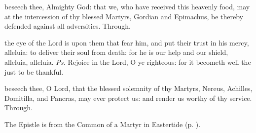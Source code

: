 \vspace{-0.3\baselineskip}

\postcommunion

\vspace{-0.1\baselineskip}

 beseech thee, Almighty God: that we, who have received this heavenly food, may at the intercession of thy blessed Martyrs, Gordian and Epimachus, be thereby defended against all adversities. Through.



\introit
{} the eye of the Lord is upon them that fear him, and put their trust in his mercy, alleluia: to deliver their soul from death: for he is our help and our shield, alleluia, alleluia. \textit{Ps.} Rejoice in the Lord, O ye righteous: for it becometh well the just to be thankful.

\vspace{-0.2\baselineskip}

\collect

\vspace{-0.1\baselineskip}

 beseech thee, O Lord, that the blessed solemnity of thy Martyrs, Nereus, Achilles, Domitilla, and Pancras, may ever protect us: and render us worthy of thy service. Through.

\begin{rubric}
	The Epistle is from the Common of a Martyr in Eastertide (p. \pageref{CommonMartyrEasterEpistle}).
\end{rubric}


\vspace{-0.2\baselineskip}


\vspace{-0.1\baselineskip}

